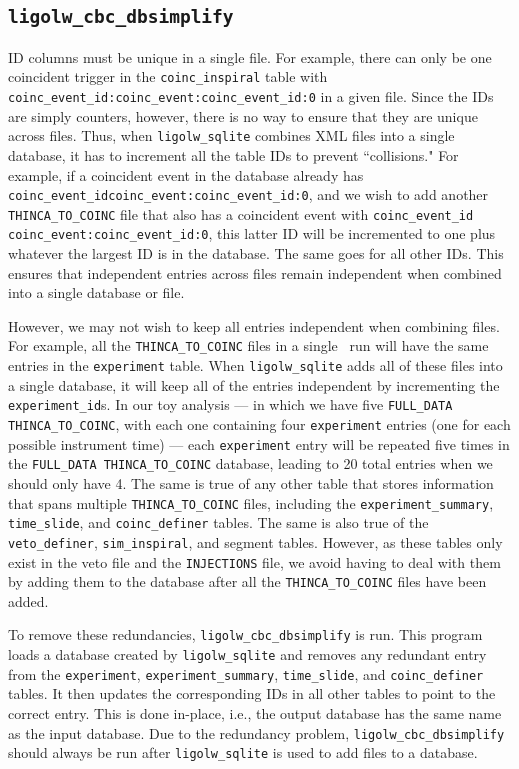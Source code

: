 \subsection{\texttt{ligolw\_cbc\_dbsimplify}}
\label{sec:dbsimplify}

ID columns must be unique in a single file. For example, there can only be one
coincident trigger in the \verb|coinc_inspiral| table with
\verb|coinc_event_id:coinc_event:coinc_event_id:0| in a given file. Since the IDs are simply
counters, however, there is no way to ensure that they are unique across files.
Thus, when \verb|ligolw_sqlite| combines XML files into a single database, it
has to increment all the table IDs to prevent ``collisions." For example, if a
coincident event in the database already has \verb|coinc_event_idcoinc_event:coinc_event_id:0|,
and we wish to add another \verb|THINCA_TO_COINC| file that also has a coincident
event with \verb|coinc_event_id coinc_event:coinc_event_id:0|, this latter ID will be
incremented to one plus whatever the largest ID is in the database. The same
goes for all other IDs. This ensures that independent entries across files
remain independent when combined into a single database or file.

However, we may not wish to keep all entries independent when combining files.
For example, all the \verb|THINCA_TO_COINC| files in a single \ihope~run will
have the same entries in the \verb|experiment| table. When \verb|ligolw_sqlite|
adds all of these files into a single database, it will keep all of the entries
independent by incrementing the \verb|experiment_id|s. In our toy analysis ---
in which we have five \verb|FULL_DATA THINCA_TO_COINC|, with each one
containing four \verb|experiment| entries (one for each possible instrument
time) --- each \verb|experiment| entry will be repeated five times in the
\verb|FULL_DATA THINCA_TO_COINC| database, leading to 20 total entries when we
should only have 4. The same is true of any other table that stores information
that spans multiple \verb|THINCA_TO_COINC| files, including the
\verb|experiment_summary|, \verb|time_slide|, and \verb|coinc_definer| tables.
The same is also true of the \verb|veto_definer|, \verb|sim_inspiral|, and
segment tables. However, as these tables only exist in the veto file and the
\verb|INJECTIONS| file, we avoid having to deal with them by adding them to the
database after all the \verb|THINCA_TO_COINC| files have been added.

To remove these redundancies, \verb|ligolw_cbc_dbsimplify| is run. This program
loads a database created by \verb|ligolw_sqlite| and removes any redundant
entry from the \verb|experiment|, \verb|experiment_summary|, \verb|time_slide|,
and \verb|coinc_definer| tables. It then updates the corresponding IDs in all
other tables to point to the correct entry. This is done in-place, i.e., the
output database has the same name as the input database. Due to the redundancy
problem, \verb|ligolw_cbc_dbsimplify| should always be run after
\verb|ligolw_sqlite| is used to add files to a database.

